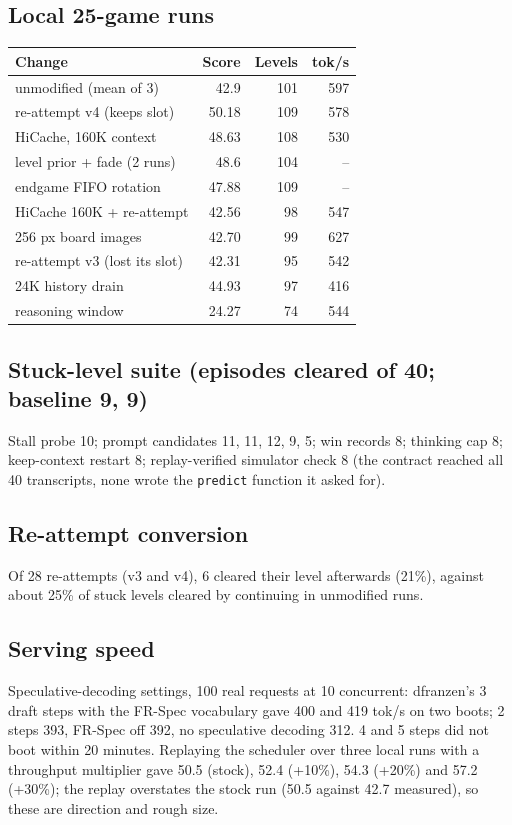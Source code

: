 \documentclass[11pt]{article}
\begin{document}
\subsection*{Local 25-game runs}
\begin{tabular}{lrrr}
\toprule
Change & Score & Levels & tok/s \\
\midrule
unmodified (mean of 3) & 42.9 & 101 & 597 \\
re-attempt v4 (keeps slot) & 50.18 & 109 & 578 \\
HiCache, 160K context & 48.63 & 108 & 530 \\
level prior + fade (2 runs) & 48.6 & 104 & -- \\
endgame FIFO rotation & 47.88 & 109 & -- \\
HiCache 160K + re-attempt & 42.56 & 98 & 547 \\
256 px board images & 42.70 & 99 & 627 \\
re-attempt v3 (lost its slot) & 42.31 & 95 & 542 \\
24K history drain & 44.93 & 97 & 416 \\
reasoning window & 24.27 & 74 & 544 \\
\bottomrule
\end{tabular}

\subsection*{Stuck-level suite (episodes cleared of 40; baseline 9, 9)}
Stall probe 10; prompt candidates 11, 11, 12, 9, 5; win records 8; thinking cap 8; keep-context restart 8; replay-verified simulator check 8
(the contract reached all 40 transcripts, none wrote the \texttt{predict} function it asked for).

\subsection*{Re-attempt conversion}
Of 28 re-attempts (v3 and v4), 6 cleared their level afterwards (21\%), against about 25\% of stuck levels
cleared by continuing in unmodified runs.

\subsection*{Serving speed}
Speculative-decoding settings, 100 real requests at 10 concurrent: dfranzen's 3 draft steps with the FR-Spec
vocabulary gave 400 and 419 tok/s on two boots; 2 steps 393, FR-Spec off 392, no speculative decoding 312.
4 and 5 steps did not boot within 20 minutes. Replaying the scheduler over three local runs with a throughput
multiplier gave 50.5 (stock), 52.4 (+10\%), 54.3 (+20\%) and 57.2 (+30\%); the replay overstates the stock run
(50.5 against 42.7 measured), so these are direction and rough size.
\end{document}
